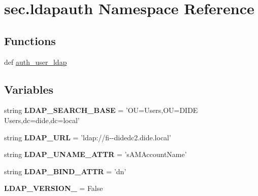\hypertarget{namespacesec_1_1ldapauth}{\section{sec.\-ldapauth Namespace Reference}
\label{namespacesec_1_1ldapauth}
}
\subsection*{Functions}
\begin{DoxyCompactItemize}
\item 
def \hyperlink{namespacesec_1_1ldapauth_a774b05bb674ea2410774dbf24469dc87}{auth\-\_\-user\-\_\-ldap}
\end{DoxyCompactItemize}
\subsection*{Variables}
\begin{DoxyCompactItemize}
\item 
\hypertarget{namespacesec_1_1ldapauth_aeeb2a9bd26872e7b3816762913fc62ce}{string {\bfseries L\-D\-A\-P\-\_\-\-S\-E\-A\-R\-C\-H\-\_\-\-B\-A\-S\-E} = 'O\-U=Users,O\-U=D\-I\-D\-E Users,dc=dide,dc=local'}\label{namespacesec_1_1ldapauth_aeeb2a9bd26872e7b3816762913fc62ce}

\item 
\hypertarget{namespacesec_1_1ldapauth_a181b59b355c2f43fddc2120e85f4ce7b}{string {\bfseries L\-D\-A\-P\-\_\-\-U\-R\-L} = 'ldap\-://fi-\/-\/didedc2.\-dide.\-local'}\label{namespacesec_1_1ldapauth_a181b59b355c2f43fddc2120e85f4ce7b}

\item 
\hypertarget{namespacesec_1_1ldapauth_a653493446e86a54d3289a7fc4a37575b}{string {\bfseries L\-D\-A\-P\-\_\-\-U\-N\-A\-M\-E\-\_\-\-A\-T\-T\-R} = 's\-A\-M\-Account\-Name'}\label{namespacesec_1_1ldapauth_a653493446e86a54d3289a7fc4a37575b}

\item 
\hypertarget{namespacesec_1_1ldapauth_a9e9ee1c0577daca43a4821b83528dfdf}{string {\bfseries L\-D\-A\-P\-\_\-\-B\-I\-N\-D\-\_\-\-A\-T\-T\-R} = 'dn'}\label{namespacesec_1_1ldapauth_a9e9ee1c0577daca43a4821b83528dfdf}

\item 
\hypertarget{namespacesec_1_1ldapauth_af070cd639773edacfbb22d48d1039828}{{\bfseries L\-D\-A\-P\-\_\-\-V\-E\-R\-S\-I\-O\-N\-\_} = False}\label{namespacesec_1_1ldapauth_af070cd639773edacfbb22d48d1039828}

\end{DoxyCompactItemize}


